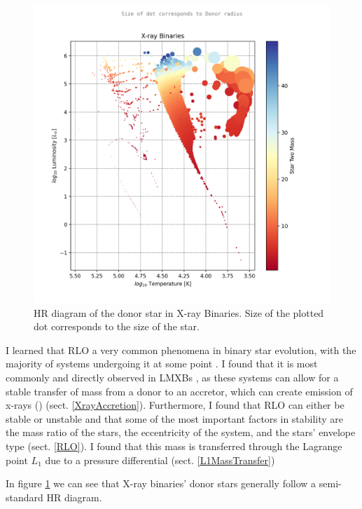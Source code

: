 \documentclass[12pt, a4paper]{article}
\begin{document}
        \begin{figure}[H]
            \centering
            \includegraphics[scale = .6]{figs/GeneratedFigs/ X-ray Binaries Star Two Mass log10 F star radius T.png}
            \caption{HR diagram of the donor star in X-ray Binaries. Size of the plotted dot corresponds to the size of the star.}
            \label{XrayBinaryHRDiagram}
        \end{figure}
        I learned that RLO a very common phenomena in binary star evolution, with the majority of systems undergoing it at some point \cite{TaurisvandenHeuvel+2023}. I found that it is most commonly and directly observed in LMXBs \cite{TaurisvandenHeuvel+2023}, as these systems can allow for a stable transfer of mass from a donor to an accretor, which can create emission of x-rays (\cite{TaurisvandenHeuvel+2023}) (sect. \ref{XrayAccretion}). Furthermore, I found that RLO can either be stable or unstable and that some of the most important factors in stability are the mass ratio of the stars, the eccentricity of the system, and the stars' envelope type (sect. \ref{RLO}). I found that this mass is transferred through the Lagrange point $L_1$ due to a pressure differential \parencite{TaurisvandenHeuvel+2023} (sect. \ref{L1MassTransfer}) 

        In figure \ref{XrayBinaryHRDiagram} we can see that X-ray binaries' donor stars generally follow a semi-standard HR diagram. 
        
\end{document}
